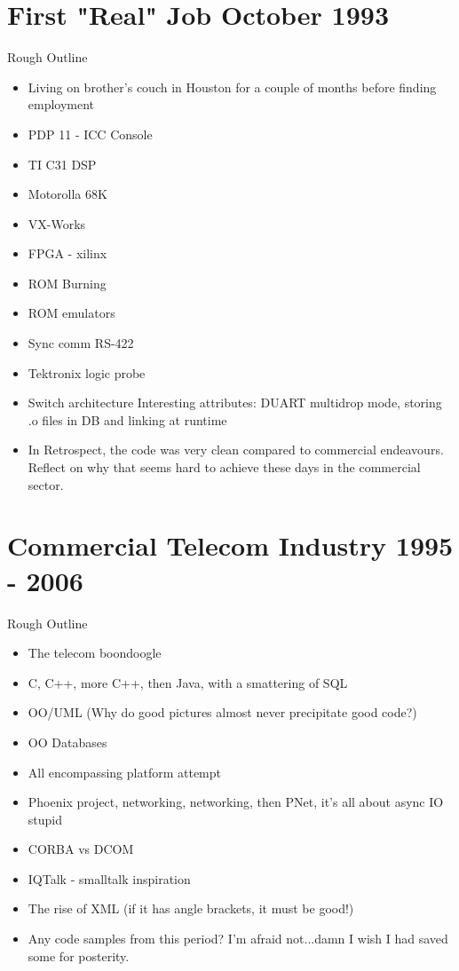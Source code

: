 \section{First "Real" Job October 1993}
	Rough Outline
	\begin{itemize}
	\item Living on brother's couch in Houston for a couple of
          months before finding employment

	\item PDP 11 - ICC Console
	\item TI C31 DSP
	\item Motorolla 68K
	\item VX-Works
	\item FPGA - xilinx
	\item ROM Burning
	\item ROM emulators
	\item Sync comm RS-422
	\item Tektronix logic probe
	\item Switch architecture Interesting attributes: DUART
          multidrop mode, storing .o files in DB and linking at
          runtime
          \item In Retrospect, the code was very clean compared
            to commercial endeavours. Reflect on why that seems hard
            to achieve these days in the commercial sector.
	\end{itemize}

\section{Commercial Telecom Industry 1995 - 2006}
	Rough Outline
	\begin{itemize}
	\item The telecom boondoogle
	\item C, C++, more C++, then Java, with a smattering of SQL
	\item OO/UML (Why do good pictures almost never precipitate
          good code?)
        \item OO Databases
	\item All encompassing platform attempt
	\item Phoenix project, networking, networking, then PNet, it's all about async IO stupid
	\item CORBA vs DCOM
	\item IQTalk - smalltalk inspiration
	\item The rise of XML (if it has angle brackets, it must be good!)
	\item Any code samples from this period? 
          I'm afraid not...damn I wish I had saved some for posterity.
	\end{itemize}
